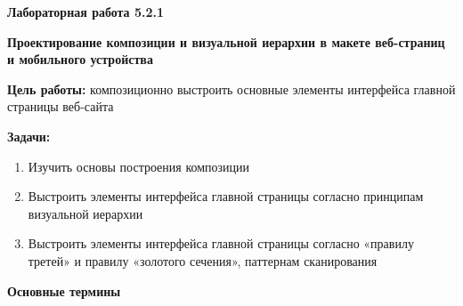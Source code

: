 
\graphicspath{ {5.2.1/models/} }

\pagestyle{fancy}
\fancyhead{}
\renewcommand{\headrulewidth}{0pt}


\begin{center}
    \textbf{Лабораторная работа 5.2.1}

    \textbf{Проектирование композиции и визуальной иерархии в макете веб-страниц и мобильного устройства}
\end{center}

\textbf{Цель работы:} композиционно выстроить основные элементы интерфейса главной страницы веб-сайта
\bigskip

\textbf{Задачи:}

\begin{enumerate}
    \item Изучить основы построения композиции
    \item Выстроить элементы интерфейса главной страницы согласно принципам визуальной иерархии
    \item Выстроить элементы интерфейса главной страницы согласно «правилу третей» и правилу «золотого сечения», паттернам сканирования
\end{enumerate}
\bigskip

\textbf{Основные термины}

